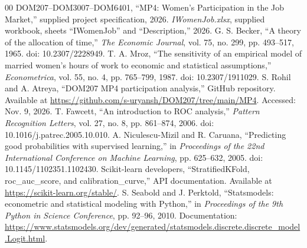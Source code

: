 \documentclass[conference]{IEEEtran}
\begin{document}
\begin{thebibliography}{00}
 DOM207--DOM3007--DOM6401, ``MP4: Women's Participation in the Job Market,'' supplied project specification, 2026.
 \textit{IWomenJob.xlsx}, supplied workbook, sheets ``IWomenJob'' and ``Description,'' 2026.
 G. S. Becker, ``A theory of the allocation of time,'' \textit{The Economic Journal}, vol. 75, no. 299, pp. 493--517, 1965. doi: 10.2307/2228949.
 T. A. Mroz, ``The sensitivity of an empirical model of married women's hours of work to economic and statistical assumptions,'' \textit{Econometrica}, vol. 55, no. 4, pp. 765--799, 1987. doi: 10.2307/1911029.
 S. Rohil and A. Atreya, ``DOM207 MP4 participation analysis,'' GitHub repository. Available at \url{https://github.com/s-uryansh/DOM207/tree/main/MP4}. Accessed: Nov. 9, 2026.
 T. Fawcett, ``An introduction to ROC analysis,'' \textit{Pattern Recognition Letters}, vol. 27, no. 8, pp. 861--874, 2006. doi: 10.1016/j.patrec.2005.10.010.
 A. Niculescu-Mizil and R. Caruana, ``Predicting good probabilities with supervised learning,'' in \textit{Proceedings of the 22nd International Conference on Machine Learning}, pp. 625--632, 2005. doi: 10.1145/1102351.1102430.
 Scikit-learn developers, ``StratifiedKFold, roc\_auc\_score, and calibration\_curve,'' API documentation. Available at \url{https://scikit-learn.org/stable/}.
 S. Seabold and J. Perktold, ``Statsmodels: econometric and statistical modeling with Python,'' in \textit{Proceedings of the 9th Python in Science Conference}, pp. 92--96, 2010. Documentation: \url{https://www.statsmodels.org/dev/generated/statsmodels.discrete.discrete_model.Logit.html}.
\end{thebibliography}
\end{document}
